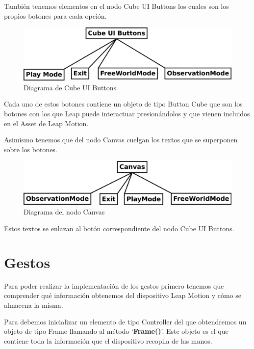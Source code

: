 \documentclass[a4paper,11pt]{article}
\begin{document}
\vspace{20px}

También tenemos elementos en el nodo Cube UI Buttons los cuales son los propios botones para cada opción.

\begin{figure}[!h]
	\includegraphics[scale=0.57]{./Imagenes/Cube_UI_Buttons.png}
	\caption{Diagrama de Cube UI Buttons}
	\label{cubeUIButtons}
\end{figure}

Cada uno de estos botones contiene un objeto de tipo Button Cube que son los botones con los que Leap puede interactuar presionándolos y que vienen incluidos en el Asset de Leap Motion.

\vspace{10px}

Asimismo tenemos que del nodo Canvas cuelgan los textos que se superponen sobre los botones.

\begin{figure}[!h]
	\includegraphics[scale=0.56]{./Imagenes/Canvas.png}
	\caption{Diagrama del nodo Canvas}
	\label{canvas}
\end{figure}

Estos textos se enlazan al botón correspondiente del nodo Cube UI Buttons.

\section{Gestos}

Para poder realizar la implementación de los gestos primero tenemos que comprender qué información obtenemos del dispositivo Leap Motion y cómo se almacena la misma. 

\vspace{10px}

Para debemos inicializar un elemento de tipo Controller del que obtendremos un objeto de tipo Frame llamando al método `\textbf{Frame()}'. Este objeto es el que contiene toda la información que el dispositivo recopila de las manos.
\end{document}
